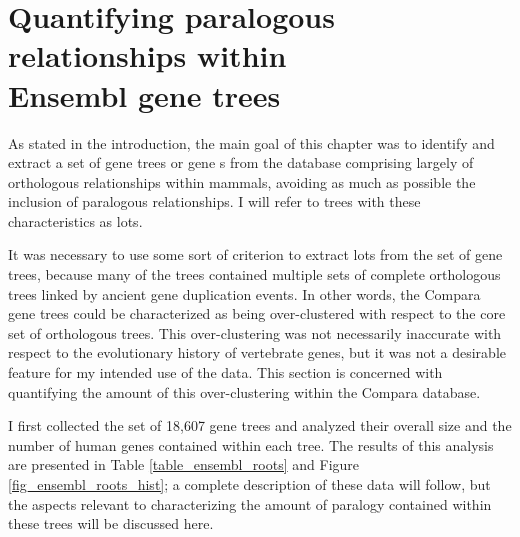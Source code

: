 \section[Quantifying paralogous relationships within Ensembl gene trees]{Quantifying paralogous relationships within \\ Ensembl gene trees}
\label{section_quantifying_paralogous}

As stated in the introduction, the main goal of this chapter was to
identify and extract a set of gene trees or gene \subtr{}s from the
\cmp database comprising largely of orthologous relationships within
mammals, avoiding as much as possible the inclusion of paralogous
relationships. I will refer to trees with these characteristics as
\acp{lot}.

It was necessary to use some sort of criterion to extract \acp{lot}
from the set of \cmp gene trees, because many of the \cmp trees
contained multiple sets of complete \mammln orthologous trees linked
by ancient gene duplication events. In other words, the Compara gene
trees could be characterized as being over-clustered with respect to
the core set of \mammln orthologous trees. This over-clustering was
not necessarily inaccurate with respect to the evolutionary history of
vertebrate genes, but it was not a desirable feature for my intended
use of the data. This section is concerned with quantifying the amount
of this over-clustering within the Compara database.

I first collected the set of 18,607 \cmp gene trees and analyzed their
overall size and the number of human genes contained within each
tree. The results of this analysis are presented in Table
\ref{table_ensembl_roots} and Figure \ref{fig_ensembl_roots_hist}; a
complete description of these data will follow,
but the aspects relevant to
characterizing the amount of paralogy contained within these trees
will be discussed here.

